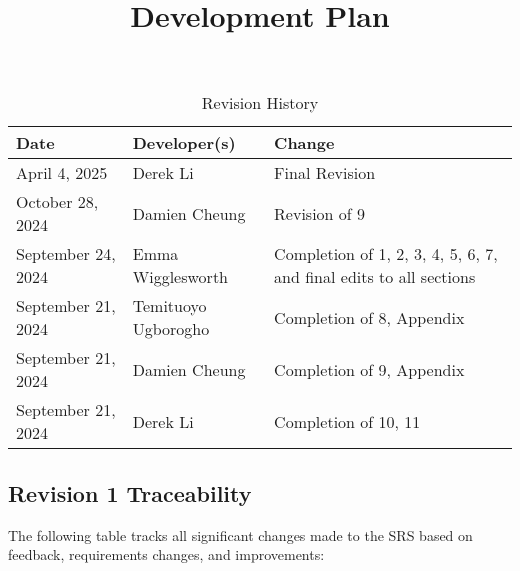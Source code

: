 \documentclass{article}
\title{Development Plan}
\date{}
\begin{document}
\maketitle

\begin{table}[hp]
\caption{Revision History} \label{TblRevisionHistory}
\begin{tabularx}{\textwidth}{llX}
\toprule
\textbf{Date} & \textbf{Developer(s)} & \textbf{Change}\\
\midrule
April 4, 2025 & Derek Li & Final Revision\\
October 28, 2024 & Damien Cheung & Revision of 9\\
September 24, 2024 & Emma Wigglesworth & Completion of 1, 2, 3, 4, 5, 6, 7, and final edits to all sections\\
September 21, 2024 & Temituoyo Ugborogho & Completion of 8, Appendix\\
September 21, 2024 & Damien Cheung & Completion of 9, Appendix\\
September 21, 2024 & Derek Li & Completion of 10, 11\\
\bottomrule
\end{tabularx}
\end{table}

\subsection{Revision 1 Traceability}
The following table tracks all significant changes made to the SRS based on feedback, requirements changes, and improvements:

\newcommand{\issueLink}[1]{\href{https://github.com/dcheung11/team-6-capstone-project/issues/#1}{Issue #1}}
\end{document}

